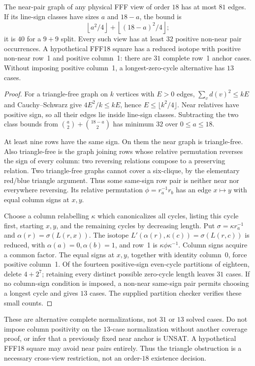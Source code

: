 \begin{corollary}
\label{cor:nonnear-anchors}
The near-pair graph of any physical FFF view of order $18$ has at most
$81$ edges. If its line-sign classes have sizes $a$ and $18-a$, the
bound is
\[
 \left\lfloor a^2/4\right\rfloor+
 \left\lfloor(18-a)^2/4\right\rfloor;
\]
it is $40$ for a $9+9$ split. Every such view has at least $32$
positive non-near pair occurrences. A hypothetical FFF18 square has
a reduced isotope with positive non-near row~1 and positive column~1:
there are $31$ complete row~1 anchor cases. Without imposing positive
column~1, a longest-zero-cycle alternative has $13$ cases.
\end{corollary}
\begin{proof}
For a triangle-free graph on $k$ vertices with $E>0$ edges,
$\sum_v d(v)^2\leq kE$ and Cauchy--Schwarz give
$4E^2/k\leq kE$, hence $E\leq\lfloor k^2/4\rfloor$.
Near relatives have positive sign, so all their edges lie inside
line-sign classes. Subtracting the two class bounds from
$\binom a2+\binom{18-a}2$ has minimum $32$ over $0\leq a\leq18$.

At least nine rows have the same sign. On them the near graph is
triangle-free. Also triangle-free is the graph joining rows whose
relative permutation reverses the sign of every column: two reversing
relations compose to a preserving relation. Two triangle-free graphs
cannot cover a six-clique, by the elementary red/blue triangle argument.
Thus some same-sign row pair is neither near nor everywhere reversing.
Its relative permutation $\phi=r_a^{-1}r_b$ has an edge
$x\mapsto y$ with equal column signs at $x,y$.

Choose a column relabelling $\kappa$ which canonicalizes all cycles,
listing this cycle first, starting $x,y$, and the remaining cycles
by decreasing length. Put $\sigma=\kappa r_a^{-1}$ and
$\alpha(r)=\sigma(L(r,x))$. The isotope
$L'(\alpha(r),\kappa(c))=\sigma(L(r,c))$ is reduced, with
$\alpha(a)=0,\alpha(b)=1$, and row~1 is $\kappa\phi\kappa^{-1}$.
Column signs acquire a common factor. The equal signs at $x,y$,
together with identity column~0, force positive column~1.
Of the fourteen positive-sign even-cycle partitions of eighteen, delete
$4+2^7$; retaining every distinct possible zero-cycle length leaves
$31$ cases. If no column-sign condition is imposed, a non-near
same-sign pair permits choosing a longest cycle and gives $13$ cases.
The supplied partition checker verifies these small counts.
\end{proof}

These are alternative complete normalizations, not $31$ or $13$ solved
cases. Do not impose column positivity on the $13$-case normalization
without another coverage proof, or infer that a previously fixed near
anchor is UNSAT. A hypothetical FFF18 square may avoid near pairs
entirely. Thus the triangle obstruction is a necessary cross-view
restriction, not an order-$18$ existence decision.
